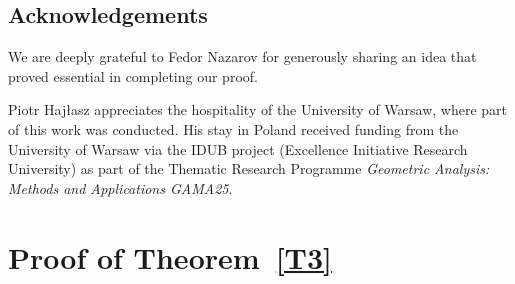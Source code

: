 \documentclass[intlimits,12pt,reqno]{amsart}
\theoremstyle{definition}
\begin{document}
\subsection*{Acknowledgements}
We are deeply grateful to Fedor Nazarov for generously sharing an idea that proved essential in completing our proof.

Piotr Hajłasz appreciates the hospitality of the University of Warsaw, where part of this work was conducted. His stay in Poland received funding from the
University of Warsaw via the IDUB project (Excellence Initiative Research University) as
part of the Thematic Research Programme \emph{Geometric Analysis: Methods and Applications GAMA25}. 

\section{Proof of Theorem~\ref{T3}}
\end{document}
